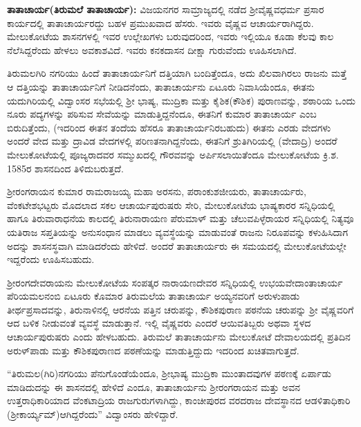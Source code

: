 \textbf{ತಾತಾಚಾರ್ಯ(ತಿರುಮಲೆ ತಾತಾಚಾರ್ಯ):} ವಿಜಯನಗರ ಸಾಮ್ರಾಜ್ಯದಲ್ಲಿ ನಡೆದ ಶ‍್ರೀವೈಷ್ಣವಧರ್ಮ ಪ್ರಸಾರ ಕಾರ್ಯದಲ್ಲಿ ತಾತಾಚಾರ್ಯರದ್ದು ಬಹಳ ಪ್ರಮುಖವಾದ ಹೆಸರು. ಇವರು ವೈಷ್ಣವ ಆಚಾರ್ಯರಾಗಿದ್ದರು. ಮೇಲುಕೋಟೆಯ ಶಾಸನಗಳಲ್ಲಿ ಇವರ ಉಲ್ಲೇಖಗಳು ಬರುವುದರಿಂದ, ಇವರು ಇಲ್ಲಿಯೂ ಕೂಡಾ ಕೆಲವು ಕಾಲ ನೆಲೆಸಿದ್ದ\-ರೆಂದು ಹೇಳಲು ಅವಕಾಶವಿದೆ. ಇವರು ಕನಕದಾಸನ ದೀಕ್ಷಾ ಗುರುವೆಂದು ಊಹಿಸಲಾಗಿದೆ.

ತಿರುಮಲಗಿರಿ ನಗರಿಯು ಹಿಂದೆ ತಾತಾಚಾರ್ಯನಿಗೆ ದತ್ತಿಯಾಗಿ ಬಂದಿತ್ತೆಂದೂ, ಅದು ಖಿಲವಾಗಿರಲು ರಾಜನು ಮತ್ತೆ ಆ ದತ್ತಿಯನ್ನು ತಾತಾಚಾರ್ಯನಿಗೆ ನೀಡಿದನೆಂದು, ತಾತಾಚಾರ್ಯನು ಏಟೂರು ನಿವಾಸಿಯೆಂದೂ, ಈತನು ಯದುಗಿರಿಯಲ್ಲಿ ವಿದ್ವಾಂಸರ ಸಭೆಯಲ್ಲಿ ಶ‍್ರೀ ಭಾಷ್ಯ, ಮುದ್ರಿಕಾ ಮತ್ತು ಕೈಶಿಕ(ಕೌಶಿಕ) ಪುರಾಣವನ್ನು, ಶಠಾರಿಯ ಒಂದು ನೂರು ಪದ್ಯಗಳನ್ನು ಪಠಿಸುವ ಸೇವೆಯನ್ನು ಮಾಡುತ್ತಿದ್ದನೆಂದೂ, ಈತನಿಗೆ ಕುಮಾರ ತಾತಾಚಾರ್ಯ ಎಂಬ ಬಿರುದಿತ್ತೆಂದು, (ಇದರಿಂದ ಈತನ ತಂದೆಯ ಹೆಸರೂ ತಾತಾಚಾರ್ಯನಿರಬಹುದು) ಈತನು ಎರಡು ವೇದಗಳು ಅಂದರೆ ವೇದ ಮತ್ತು ದ್ರಾವಿಡ ವೇದಗಳಲ್ಲಿ ಪರಿಣತನಾಗಿದ್ದನೆಂದು, ಈತನಿಗೆ ಶ್ರುತಿಗಿರಿಯಲ್ಲಿ (ವೇದಾದ್ರಿ) ಅಂದರೆ ಮೇಲುಕೋಟೆಯಲ್ಲಿ ಪೂಜ್ಯರಾದವರ ಸಮ್ಮುಖದಲ್ಲಿ ಗೌರವವನ್ನು ಅರ್ಪಿಸಲಾಯಿತೆಂದೂ ಮೇಲುಕೋಟೆಯ ಕ್ರಿ.ಶ. 1585ರ ಶಾಸನದಿಂದ ತಿಳಿದುಬರುತ್ತದೆ.

ಶ‍್ರೀರಂಗರಾಯನ ಕುಮಾರ ರಾಮರಾಜಯ್ಯ ಮಹಾ ಅರಸನು, ಪರಾಂಕುಶಜೀಯರು, ತಾತಾಚಾರ್ಯರು, ವೆಂಕಟೇಶಭಟ್ಟರು ಮೊದಲಾದ ಸಕಲ ಆಚಾರ್ಯಪುರುಷರು ಸೇರಿ, ಮೇಲುಕೋಟೆಯ ಭಾಷ್ಯಕಾರರ ಸನ್ನಿಧಿಯಲ್ಲಿ ಹಾಗೂ ತಿರುವಾರಾಧನೆಯ ಕಾಲದಲ್ಲಿ ತಿರುನಾರಾಯಣ ಪೆರುಮಾಳ್​ ಮತ್ತು ಚೆಲುವಪಿಳ್ಳೆರಾಯರ ಸನ್ನಿಧಿಯಲ್ಲಿ ನಿತ್ಯವೂ ಯತಿರಾಜ ಸಪ್ತತಿಯನ್ನು ಅನುಸಂಧಾನ ಮಾಡಲು ವ್ಯವಸ್ಥೆಯನ್ನು ಮಾಡುವಂತೆ ರಾಜನು ನಿರೂಪವನ್ನು ಕಳುಹಿಸಿದಾಗ ಅದನ್ನು ಶಾಸನಸ್ಥವಾಗಿ ಮಾಡಿದರೆಂದು ಹೇಳಿದೆ. ಅಂದರೆ ತಾತಾಚಾರ್ಯರು ಈ ಸಮಯದಲ್ಲಿ ಮೇಲುಕೋಟೆಯಲ್ಲೇ ಇದ್ದರೆಂದು ಊಹಿಸಬಹುದು.

ಶ‍್ರೀರಂಗದೇವರಾಯನು ಮೇಲುಕೋಟೆಯ ಸಂಪತ್ಕರ ನಾರಾಯಣದೇವರ ಸನ್ನಿಧಿಯಲ್ಲಿ ಉಭಯವೇದಾಂತಾ\-ಚಾರ್ಯ ಪೆರಿಯಮಲನಂಬಿ ಏಟೂರು ಕೊಮಾರ ತಿರುಮಲೆಯ ತಾತಾಚಾರ್ಯ ಅಯ್ಯನವರಿಗೆ ಅರುಳುಪಾಡು ತೀರ್ಥ\-ಪ್ರಸಾದವನ್ನು, ತಿರುನಾಳಿನಲ್ಲಿ ಆರನೆಯ ಪತ್ತಿನ ಚರುಪನ್ನು, ಕೌಶಿಕಪುರಾಣ ಪಠನೆಯ ಚರುಪನ್ನು ಶ‍್ರೀ ವೈಷ್ಣವರಿಗೆ ಆದ ಬಳಿಕ ನೀಡುವಂತೆ ವ್ಯವಸ್ಥೆ ಮಾಡುತ್ತಾನೆ. ಇಲ್ಲಿ ವೈಷ್ಣವರು ಎಂದರೆ ಆಯಿವತಿಬ್ಬರು ಅಥವಾ ಸ್ಥಳದ ಆಚಾರ್ಯಪುರುಷರು ಎಂದು ಹೇಳಬಹುದು. ತಿರುಮಲೆ ತಾತಾಚಾರ್ಯನು ಮೇಲುಕೋಟೆ ದೇವಾಲಯದಲ್ಲಿ ಪ್ರತಿದಿನ ಅರುಳ್​ಪಾಡು ಮತ್ತು ಕೌಶಿಕಪುರಾಣದ ಪಠಣೆಯನ್ನು ಮಾಡುತ್ತಿದ್ದುದು ಇದರಿಂದ ಖಚಿತವಾಗುತ್ತದೆ.

“ತಿರುಮಲ(ಗಿರಿ)ನಗರಿಯು ಪೆನುಗೊಂಡೆಯೆಂದೂ, ಶ‍್ರೀಭಾಷ್ಯ ಮುದ್ರಿಕಾ ಮುಂತಾದವುಗಳ ಪಠಣಕ್ಕೆ ಏರ್ಪಾಡು ಮಾಡಿದುದನ್ನು ಈ ಶಾಸನದಲ್ಲಿ ಹೇಳಿದೆ ಎಂದೂ, ತಾತಾಚಾರ್ಯನು ಶ‍್ರೀರಂಗರಾಯನ ಮತ್ತು ಅವನ ಉತ್ತರಾಧಿಕಾರಿಯಾದ ವೆಂಕಟಾದ್ರಿಯ ರಾಜಗುರುಗಳಾಗಿದ್ದು, ಕಾಂಚೀಪುರದ ವರದರಾಜ ದೇವಸ್ಥಾನದ ಆಡಳಿತಾಧಿಕಾರಿ (ಶ‍್ರೀಕಾರ್ಯ್ಯಮ್)\break ಆಗಿದ್ದರೆಂದು” ವಿದ್ವಾಂಸರು ಹೇಳಿದ್ದಾರೆ.

